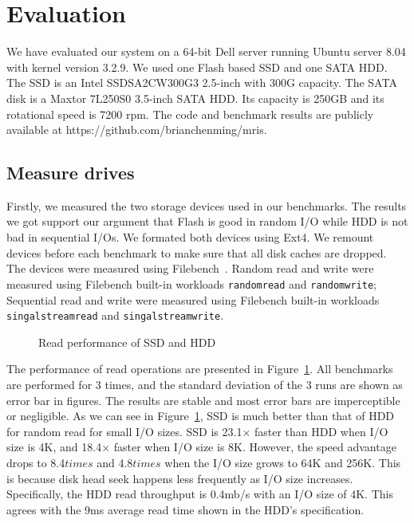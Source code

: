 \section{Evaluation} \label{sec:eval}

We have evaluated our system on a 64-bit Dell server running Ubuntu
server 8.04 with kernel version 3.2.9. We used one Flash based SSD and
one SATA HDD. The SSD is an Intel SSDSA2CW300G3 2.5-inch with 300G
capacity. The SATA disk is a Maxtor 7L250S0 3.5-inch SATA HDD. Its
capacity is 250GB and its rotational speed is 7200 rpm. The code and
benchmark results are publicly available at
https://github.com/brianchenming/mris.

\subsection{Measure drives}

Firstly, we measured the two storage devices used in our benchmarks.
The results we got support our argument that Flash is good in random
I/O while HDD is not bad in sequential I/Os. We formated both devices
using Ext4. We remount devices before each benchmark to make sure that
all disk caches are dropped. The devices were measured using
Filebench~\cite{filebench-web}. Random read and write were measured
using Filebench built-in workloads \texttt{randomread} and
\texttt{randomwrite}; Sequential read and write were measured using
Filebench built-in workloads \texttt{singalstreamread} and
\texttt{singalstreamwrite}.

\begin{figure}[t]
\begin{centering}
\caption{Read performance of SSD and HDD}
\label{fig:driveread}
\end{centering}
\end{figure}

The performance of read operations are presented in
Figure~\ref{fig:driveread}. All benchmarks are performed for 3 times,
and the standard deviation of the 3 runs are shown as error bar in
figures. The results are stable and most error bars are imperceptible
or negligible. As we can see in Figure~\ref{fig:driveread}, SSD is
much better than that of HDD for random read for small I/O sizes. SSD
is 23.1$\times$ faster than HDD when I/O size is 4K, and 18.4$\times$
faster when I/O size is 8K. However, the speed advantage drops to
8.4$times$ and 4.8$times$ when the I/O size grows to 64K and 256K.
This is because disk head seek happens less frequently as I/O size
increases. Specifically, the HDD read throughput is 0.4mb/s with an
I/O size of 4K. This agrees with the 9ms average read time shown in
the HDD's specification.  

